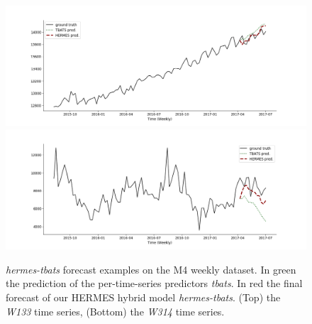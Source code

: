 \documentclass[review]{elsarticle}
\begin{document}
\begin{figure}
\centering
  \includegraphics[width=1.\linewidth]{figure/W133_pred}
  \includegraphics[width=1.\linewidth]{figure/W314_pred}
\caption{\textit{hermes-tbats} forecast examples on the M4 weekly dataset. In green the prediction of the per-time-series predictors \textit{tbats}. In red the final forecast of our HERMES hybrid model \textit{hermes-tbats}. (Top) the \textit{W133} time series, (Bottom) the \textit{W314} time series.}
\label{fig:m4pred}
\end{figure}
\end{document}
